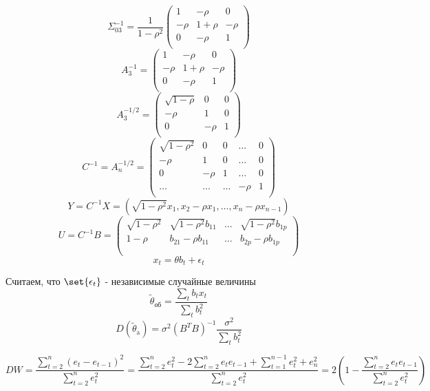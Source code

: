 \documentclass[a4paper]{article}
\DeclarePairedDelimiter\set\{\}
\theoremstyle{definition}
\theoremstyle{remark}
\begin{document}
\[
    \Sigma_{03}^{-1} = \frac{1}{1-\rho^2} \begin{pmatrix}
    1 & -\rho & 0\\
    -\rho & 1+\rho & -\rho\\
    0 & -\rho & 1\\
    
    \end{pmatrix}
\]
\[
    A^{-1}_3 = 
    \begin{pmatrix}
    1 & -\rho & 0\\
    -\rho & 1+\rho & -\rho\\
    0 & -\rho & 1\\
    
    \end{pmatrix}
\]
\[
    A_{3}^{-1/2} = 
    \begin{pmatrix}
    \sqrt{1-\rho}  & 0 & 0\\
    -\rho & 1 & 0\\
    0 & -\rho & 1\\
    
    \end{pmatrix}
\]
\[
    C^{-1} = A_n^{-1/2} = 
    \begin{pmatrix}
    \sqrt{1-\rho^2}  & 0 & 0 & \dots & 0\\
    -\rho & 1 & 0 & \dots & 0\\
    0 & -\rho & 1 & \dots & 0\\
    \dots & \dots & \dots & -\rho & 1\\
    
    \end{pmatrix}
\]
\[
    Y = C^{-1} X = (\sqrt{1-\rho^2} x_1, x_2- \rho x_1, \dots, x_n - \rho x_{n-1})
\]
\[
    U = C^{-1} B = \begin{pmatrix}
    \sqrt{1-\rho^2}  & \sqrt{1-\rho^2} b_{11} & \dots & \sqrt{1-\rho^2} b_{1p} \\
    1- \rho& b_{21}-\rho b_{11}  & \dots & b_{2p} - \rho b_{1p} \\
     &  &  & \\
    
    \end{pmatrix}
\]
\[
    x_t = \theta b_t + \epsilon_t
\]

Считаем, что $ \set{\epsilon_t} $ - независимые случайные величины
\[
    \tilde{\theta}_{\text{об}} = \frac{\sum_{t} b_t x_t}{\sum_{t} b^2_t} 
\]
\[
    D(\tilde{\theta}_{\text{a}}) = \sigma^2(B^TB)^{-1} \frac{\sigma^2}{\sum_{t} b^2_t} 
\]

\[
    DW = \frac{\sum_{t=2}^{n} (e_t - e_{t-1})^2}{\sum_{t=2}^{n} e_t^2} =
    \frac{\sum_{t=2}^{n} e_t^2 - 2 \sum_{t=2}^{n} e_t e_{t-1} + \sum_{t=1}^{n-1}e_t^2 +
    e_n^2}{\sum_{t=2}^{n} e_t^2} = 
    2 \left( 1 - \frac{\sum_{t=2}^{n}e_te_{t-1}}{\sum_{t=2}^{n} e_t^2}\right) 
\]
\end{document}
